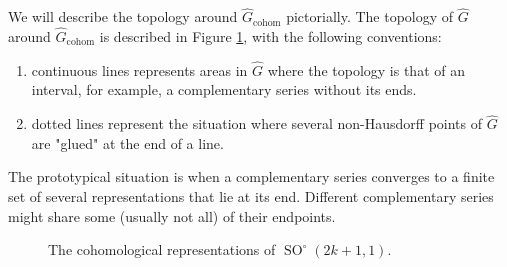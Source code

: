 \documentclass[12pt,reqno]{amsart}
\theoremstyle{definition}
\newcommand{\SO}{\operatorname{SO}}
\begin{document}
We will describe the topology around $\widehat{G}_{\mathrm{cohom}}$ pictorially. The topology of $\widehat{G}$ around $\widehat{G}_{\mathrm{cohom}}$ is described in Figure \ref{fig:cohom_reps_so(2k,1)}, with the following conventions:
\begin{enumerate}
    \item continuous lines represents areas in $\widehat{G}$ where the topology is that of an interval, for example, a complementary series without its ends.
    \item dotted lines represent the situation where several non-Hausdorff points of $\widehat{G}$ are "glued" at the end of a line. 
\end{enumerate}
The prototypical situation is when a complementary series converges to a finite set of several representations that lie at its end. Different complementary series might share some (usually not all) of their endpoints. 
\begin{figure}[htbp]
    \centering
    \caption{The cohomological representations of $\SO^\circ(2k+1,1)$.}
    \label{fig:cohom_reps_so(2k,1)}
\end{figure}
\end{document}
